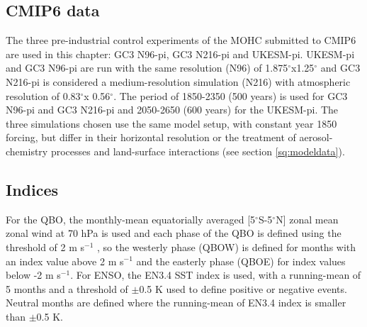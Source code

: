 \subsection{CMIP6 data}

The three pre-industrial control experiments of the MOHC submitted to CMIP6 are used in this chapter: GC3 N96-pi, GC3 N216-pi and UKESM-pi. UKESM-pi and GC3 N96-pi are run with the same resolution (N96) of 1.875$^\circ$x1.25$^\circ$ and GC3 N216-pi is considered a medium-resolution simulation (N216) with atmospheric resolution of 0.83$^\circ$x 0.56$^\circ$. The period of 1850-2350 (500 years) is used for GC3 N96-pi and GC3 N216-pi and 2050-2650 (600 years) for the UKESM-pi. 
The three simulations chosen use the same model setup, with constant year 1850 forcing, but differ in their horizontal resolution or the treatment of aerosol-chemistry processes and land-surface interactions (see section \ref{sq:modeldata}). 



\subsection{Indices}
\label{sq:indices}

For the QBO, the monthly-mean equatorially averaged [5$^\circ$S-5$^\circ$N] zonal mean zonal wind at 70 hPa is used  and each phase of the QBO is defined using the threshold of 2 m s$^{-1}$ \citep{garfinkel2010}, so the westerly phase (QBOW) is defined for months with an index value above 2 m s$^{-1}$ and the easterly phase (QBOE) for index values below -2 m s$^{-1}$. For ENSO, the EN3.4 SST index is used, with a running-mean of 5 months and a threshold of $\pm$0.5 K used to define positive or negative events. Neutral months are defined where the running-mean of EN3.4 index is smaller than $\pm$0.5 K.

